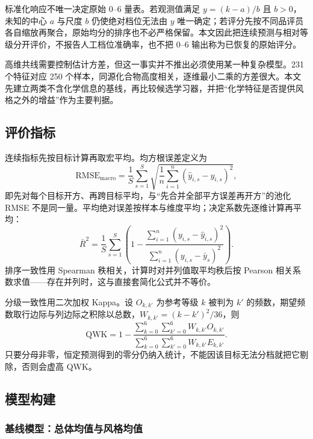 \documentclass[UTF8,a4paper,zihao=-4]{ctexart}
\numberwithin{figure}{section}
\numberwithin{table}{section}
\numberwithin{equation}{section}
\begin{document}
标准化响应不唯一决定原始 0--6 量表。若观测值满足 $y=(k-a)/b$ 且 $b>0$，未知的中心 $a$ 与尺度 $b$ 仍使绝对档位无法由 $y$ 唯一确定；若评分先按不同品评员各自缩放再聚合，原始均分的排序也不必严格保留。本文因此把连续预测与相对等级分开评价，不报告人工档位准确率，也不把 0--6 输出称为已恢复的原始评分。

高维共线需要控制估计方差，但这一事实并不推出必须使用某一种复杂模型。231 个特征对应 250 个样本，同源化合物高度相关，逐维最小二乘的方差很大。本文先建立两类不含化学信息的基线，再比较候选学习器，并把“化学特征是否提供风格之外的增益”作为主要判据。

\subsection{评价指标}

连续指标先按目标计算再取宏平均。均方根误差定义为
\begin{equation}
\mathrm{RMSE}_{\mathrm{macro}}=\frac{1}{S}\sum_{s=1}^{S}\sqrt{\frac{1}{n}\sum_{i=1}^{n}\left(\hat y_{i,s}-y_{i,s}\right)^{2}},
\label{eq:rmse-macro}
\end{equation}
即先对每个目标开方、再跨目标平均，与“先合并全部平方误差再开方”的池化 RMSE 不是同一量。平均绝对误差按样本与维度平均；决定系数先逐维计算再平均：
\begin{equation}
\bar R^{2}=\frac{1}{S}\sum_{s=1}^{S}\left(1-\frac{\sum_{i=1}^{n}(y_{i,s}-\hat y_{i,s})^{2}}{\sum_{i=1}^{n}(y_{i,s}-\bar y_{s})^{2}}\right).
\label{eq:r2-macro}
\end{equation}
排序一致性用 Spearman 秩相关，计算时对并列值取平均秩后按 Pearson 相关系数求值——存在并列时，这与直接套简化公式并不等价。

分级一致性用二次加权 Kappa\cite{cohen1968}。设 $O_{k,k'}$ 为参考等级 $k$ 被判为 $k'$ 的频数，期望频数取行边际与列边际之积除以总数，$W_{k,k'}=(k-k')^{2}/36$，则
\begin{equation}
\mathrm{QWK}=1-\frac{\sum_{k=0}^{6}\sum_{k'=0}^{6}W_{k,k'}O_{k,k'}}{\sum_{k=0}^{6}\sum_{k'=0}^{6}W_{k,k'}E_{k,k'}}.
\label{eq:qwk}
\end{equation}
只要分母非零，恒定预测得到的零分仍纳入统计，不能因该目标无法分档就把它剔除，否则会虚高 QWK。

\subsection{模型构建}

\subsubsection{基线模型：总体均值与风格均值}
\end{document}
